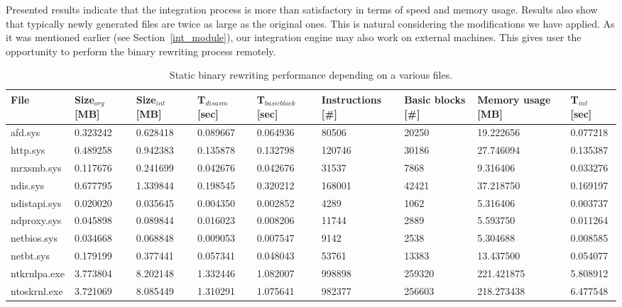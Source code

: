 \documentclass[10pt,twocolumn,a4paper]{article}
\begin{document}
Presented results indicate that the integration process is more than satisfactory in terms of speed and memory usage. Results also show that typically newly generated files are twice as large as the original ones. This is natural considering the modifications we have applied. As it was mentioned earlier (see Section~\ref{int_module}), our integration engine may also work on external machines. This gives user the opportunity to perform the binary rewriting process remotely.

\begin{table*}[!ht]
  \centering
  \caption{Static binary rewriting performance depending on a various files.}
\begin{tabular}{|p{1.75cm}|p{1.3cm}|p{1.3cm}|p{1.4cm}|p{1.45cm}|p{1.60cm}|p{1.55cm}|p{1.7cm}|p{1.35cm}|}
    \addlinespace
    \toprule
    File & Size$_{org}$ [MB]& Size$_{int}$ [MB] & T$_{disasm}$ [sec] & T$_{basicblock}$ [sec] & Instructions [\#] & Basic blocks [\#] & Memory usage [MB] & T$_{int}$ [sec]\\
    \midrule
    afd.sys & 0.323242 & 0.628418 & 0.089667 & 0.064936 & 80506 & 20250 & 19.222656 & 0.077218 \\
    \hline
    http.sys & 0.489258 & 0.942383 & 0.135878 & 0.132798 & 120746 & 30186 & 27.746094 & 0.135387 \\
    \hline
    mrxsmb.sys & 0.117676 & 0.241699 & 0.042676 & 0.042676 & 31537 & 7868  & 9.316406 & 0.033276 \\
    \hline
    ndis.sys & 0.677795  & 1.339844 & 0.198545 & 0.320212 & 168001 & 42421 & 37.218750 & 0.169197 \\
    \hline
    ndistapi.sys & 0.020020 & 0.035645  & 0.004350 & 0.002852 & 4289  & 1062  & 5.316406 & 0.003737 \\
    \hline
    ndproxy.sys & 0.045898 & 0.089844 & 0.016023 & 0.008206 & 11744 & 2889  & 5.593750  & 0.011264  \\
    \hline
    netbios.sys & 0.034668  & 0.068848 & 0.009053 & 0.007547 & 9142  & 2538  & 5.304688 & 0.008585 \\
    \hline
    netbt.sys & 0.179199  & 0.377441 & 0.057341 & 0.048043 & 53761 & 13383 & 13.437500 & 0.054077 \\
    \hline
    ntkrnlpa.exe & 3.773804 & 8.202148 & 1.332446 & 1.082007 & 998898 & 259320 & 221.421875 & 5.808912 \\
    \hline
    ntoskrnl.exe & 3.721069 & 8.085449 & 1.310291 & 1.075641 & 982377 & 256603 & 218.273438 & 6.477548 \\
    \hline

\end{tabular}
\end{table*}
\end{document}
